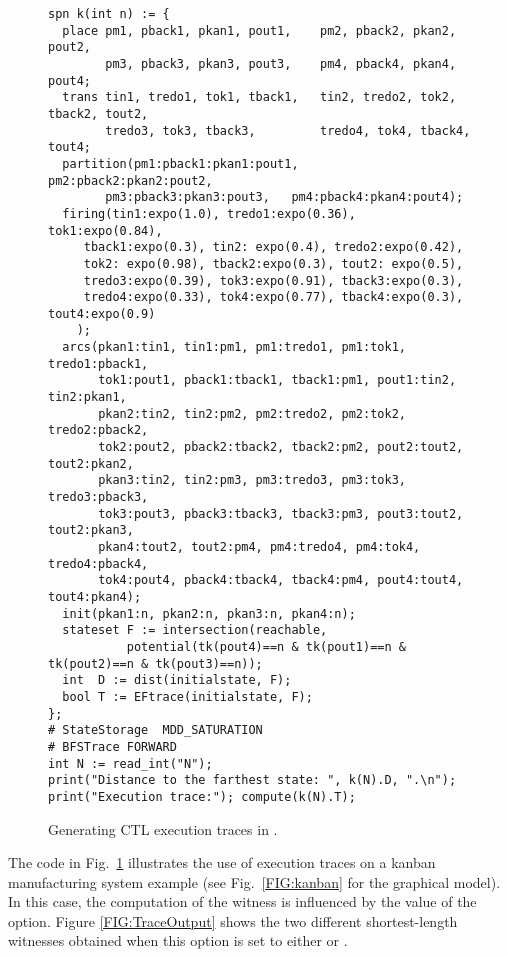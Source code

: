 \begin{private}


\begin{figure}
\begin{lstlisting}
spn k(int n) := {
  place pm1, pback1, pkan1, pout1,    pm2, pback2, pkan2, pout2,
        pm3, pback3, pkan3, pout3,    pm4, pback4, pkan4, pout4;
  trans tin1, tredo1, tok1, tback1,   tin2, tredo2, tok2, tback2, tout2,
        tredo3, tok3, tback3,         tredo4, tok4, tback4, tout4;
  partition(pm1:pback1:pkan1:pout1,   pm2:pback2:pkan2:pout2, 
	    pm3:pback3:pkan3:pout3,   pm4:pback4:pkan4:pout4);
  firing(tin1:expo(1.0), tredo1:expo(0.36), tok1:expo(0.84), 
	 tback1:expo(0.3), tin2: expo(0.4), tredo2:expo(0.42), 
	 tok2: expo(0.98), tback2:expo(0.3), tout2: expo(0.5), 
	 tredo3:expo(0.39), tok3:expo(0.91), tback3:expo(0.3), 
	 tredo4:expo(0.33), tok4:expo(0.77), tback4:expo(0.3), tout4:expo(0.9)
	); 
  arcs(pkan1:tin1, tin1:pm1, pm1:tredo1, pm1:tok1, tredo1:pback1,
       tok1:pout1, pback1:tback1, tback1:pm1, pout1:tin2, tin2:pkan1,
       pkan2:tin2, tin2:pm2, pm2:tredo2, pm2:tok2, tredo2:pback2,
       tok2:pout2, pback2:tback2, tback2:pm2, pout2:tout2, tout2:pkan2,
       pkan3:tin2, tin2:pm3, pm3:tredo3, pm3:tok3, tredo3:pback3,
       tok3:pout3, pback3:tback3, tback3:pm3, pout3:tout2, tout2:pkan3,
       pkan4:tout2, tout2:pm4, pm4:tredo4, pm4:tok4, tredo4:pback4,
       tok4:pout4, pback4:tback4, tback4:pm4, pout4:tout4, tout4:pkan4);
  init(pkan1:n, pkan2:n, pkan3:n, pkan4:n); 
  stateset F := intersection(reachable,
           potential(tk(pout4)==n & tk(pout1)==n & tk(pout2)==n & tk(pout3)==n));
  int  D := dist(initialstate, F);
  bool T := EFtrace(initialstate, F);
};
# StateStorage  MDD_SATURATION
# BFSTrace FORWARD
int N := read_int("N");
print("Distance to the farthest state: ", k(N).D, ".\n");
print("Execution trace:"); compute(k(N).T);
\end{lstlisting}
\caption{Generating CTL execution traces in {\smart}.}
\label{FIG:KanbanTraces}
\end{figure}


The code in Fig.~\ref{FIG:KanbanTraces} illustrates the use of execution
traces on a kanban manufacturing system example (see Fig.~\ref{FIG:kanban}
for the graphical model).
In this case, the computation of the witness is influenced by the value of the
 option.
Figure \ref{FIG:TraceOutput} shows the two different shortest-length witnesses
obtained when this option is set to either  or .


\end{private}
